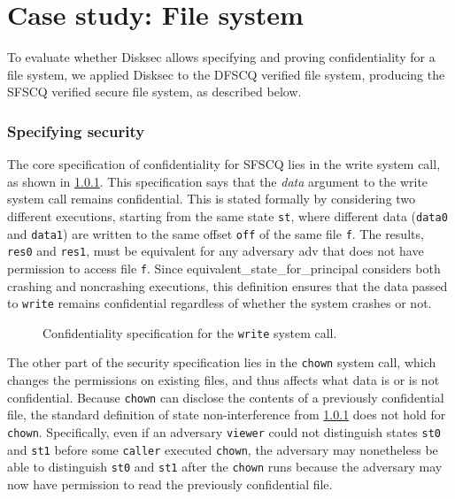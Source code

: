 \chapter{Case study: File system}
\label{s:fs}

To evaluate whether Disksec allows specifying and proving confidentiality
for a file system, we applied Disksec to the DFSCQ verified file system,
producing the SFSCQ verified secure file system, as described below.


\subsection{Specifying security}

The core specification of confidentiality for SFSCQ lies in the
write system call, as shown in \ref{}.  This
specification says that the \emph{data} argument to the {write}
system call remains confidential.  This is stated formally by
considering two different executions, starting from the same
state \texttt{st}, where different data (\texttt{data0} and \texttt{data1})
are written to the same offset \texttt{off} of the same file \texttt{f}.
The results, \texttt{res0} and \texttt{res1}, must be equivalent for any
adversary {adv} that does not have permission to access file \texttt{f}.
Since {equivalent\_state\_for\_principal} considers both crashing and
noncrashing executions, this definition ensures that the data passed to
\texttt{write} remains confidential regardless of whether the system crashes
or not.

\begin{figure}[ht]
  
  \caption{Confidentiality specification for the \texttt{write} system call.}
  \label{fig:writespec}
\end{figure}

The other part of the security specification lies in the \texttt{chown}
system call, which changes the permissions on existing files, and thus
affects what data is or is not confidential.  Because \texttt{chown} can
disclose the contents of a previously confidential file, the standard
definition of state non-interference from \ref{}
does not hold for \texttt{chown}.  Specifically, even if an adversary
\texttt{viewer} could not distinguish states \texttt{st0} and \texttt{st1} before some
\texttt{caller} executed \texttt{chown}, the adversary may nonetheless be able
to distinguish \texttt{st0} and \texttt{st1} after the \texttt{chown} runs because
the adversary may now have permission to read the previously confidential
file.

